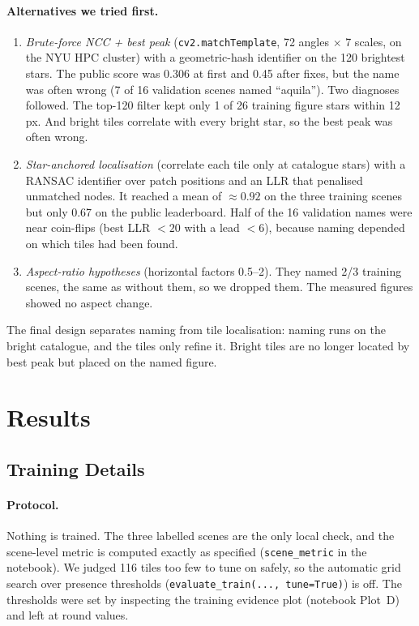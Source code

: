 \documentclass[a4paper,11pt]{article}
\begin{document}
\paragraph{Alternatives we tried first.}
\label{sec:alternatives}
\begin{enumerate}
\item \emph{Brute-force NCC + best peak} (\texttt{cv2.matchTemplate}, 72 angles $\times$ 7 scales, on the NYU HPC
cluster) with a geometric-hash identifier on the 120 brightest stars. The public score was 0.306 at first and 0.45 after
fixes, but the name was often wrong (7 of 16 validation scenes named ``aquila''). Two diagnoses followed. The top-120
filter kept only 1 of 26 training figure stars within 12\,px. And bright tiles correlate with every bright star, so the
best peak was often wrong.
\item \emph{Star-anchored localisation} (correlate each tile only at catalogue stars) with a RANSAC identifier over
patch positions and an LLR that penalised unmatched nodes. It reached a mean of $\approx0.92$ on the three training
scenes but only 0.67 on the public leaderboard. Half of the 16 validation names were near coin-flips (best LLR $<20$
with a lead $<6$), because naming depended on which tiles had been found.
\item \emph{Aspect-ratio hypotheses} (horizontal factors 0.5--2). They named 2/3 training scenes, the same as without them, so we dropped
them. The measured figures showed no aspect change.
\end{enumerate}
The final design separates naming from tile localisation: naming runs on the bright catalogue, and the tiles only
refine it. Bright tiles are no longer located by best peak but placed on the named figure.

\section{Results}

\subsection{Training Details}

\paragraph{Protocol.} Nothing is trained. The three labelled scenes are the only local check, and the scene-level metric
is computed exactly as specified (\texttt{scene\_metric} in the notebook). We judged 116 tiles too few to tune on safely, so the
automatic grid search over presence thresholds (\texttt{evaluate\_train(..., tune=True)}) is off. The thresholds were
set by inspecting the training evidence plot (notebook Plot~D) and left at round values.
\end{document}
